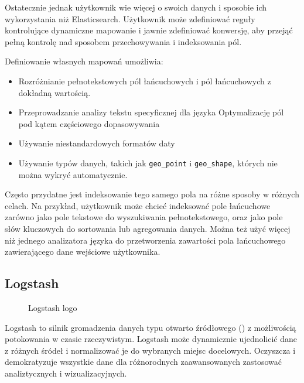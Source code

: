 Ostatecznie jednak użytkownik wie więcej o swoich danych i sposobie ich wykorzystania niż Elasticsearch. Użytkownik może zdefiniować reguły kontrolujące dynamiczne mapowanie i jawnie zdefiniować konwersję, aby przejąć pełną kontrolę nad sposobem przechowywania i indeksowania pól\cite{elasticSearchManualDataIn}.

Definiowanie własnych mapowań umożliwia:

\begin{itemize}
    \item Rozróżnianie pełnotekstowych pól łańcuchowych i pól łańcuchowych z dokładną wartością.
    \item Przeprowadzanie analizy tekstu specyficznej dla języka
    Optymalizację pól pod kątem częściowego dopasowywania
    \item Używanie niestandardowych formatów daty
    \item Używanie typów danych, takich jak \verb|geo_point| i \verb|geo_shape|, których nie można wykryć automatycznie.
\end{itemize}

Często przydatne jest indeksowanie tego samego pola na różne sposoby w różnych celach. Na przykład, użytkownik może chcieć indeksować pole łańcuchowe zarówno jako pole tekstowe do wyszukiwania pełnotekstowego, oraz jako pole słów kluczowych do sortowania lub agregowania danych. Można też użyć więcej niż jednego analizatora języka do przetworzenia zawartości pola łańcuchowego zawierającego dane wejściowe użytkownika\cite{elasticSearchManualDataIn}.

\subsection{ Logstash }

\begin{figure}[!htbp]
    \centering
    
    \caption{Logstash logo\cite{logstashMain}}
    \label{fig:enter-label}
\end{figure}

Logstash to silnik gromadzenia danych typu otwarto źródłowego () z możliwością potokowania w czasie rzeczywistym. Logstash może dynamicznie ujednolicić dane z różnych śródeł i normalizować je do wybranych miejsc docelowych. Oczyszcza i demokratyzuje wszystkie dane dla różnorodnych zaawansowanych zastosować analiztycznych i wizualizacyjnych\cite{logstashManualIntroduction}.

